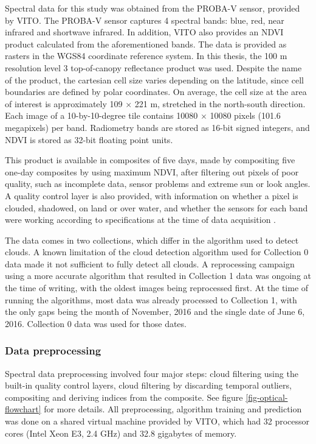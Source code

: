 \documentclass[a4paper,10pt]{book}
\begin{document}
Spectral data for this study was obtained from the PROBA-V sensor, provided by VITO. The PROBA-V sensor captures 4 spectral bands: blue, red, near infrared and shortwave infrared. In addition, VITO also provides an NDVI product calculated from the aforementioned bands. The data is provided as rasters in the WGS84 coordinate reference system. In this thesis, the 100 m resolution level 3 top-of-canopy reflectance product was used. Despite the name of the product, the cartesian cell size varies depending on the latitude, since cell boundaries are defined by polar coordinates. On average, the cell size at the area of interest is approximately 109 $\times{}$ 221 m, stretched in the north-south direction. Each image of a 10-by-10-degree tile contains 10080 $\times{}$ 10080 pixels (101.6 megapixels) per band. Radiometry bands are stored as 16-bit signed integers, and NDVI is stored as 32-bit floating point units.

This product is available in composites of five days, made by compositing five one-day composites by using maximum NDVI, after filtering out pixels of poor quality, such as incomplete data, sensor problems and extreme sun or look angles. A quality control layer is also provided, with information on whether a pixel is clouded, shadowed, on land or over water, and whether the sensors for each band were working according to specifications at the time of data acquisition \citep{probavguide2}.

The data comes in two collections, which differ in the algorithm used to detect clouds. A known limitation of the cloud detection algorithm used for Collection 0 data made it not sufficient to fully detect all clouds. A reprocessing campaign using a more accurate algorithm that resulted in Collection 1 data \citep{probavguide2} was ongoing at the time of writing, with the oldest images being reprocessed first. At the time of running the algorithms, most data was already processed to Collection 1, with the only gaps being the month of November, 2016 and the single date of June 6, 2016. Collection 0 data was used for those dates.

\subsubsection{Data preprocessing}
\label{sec-spectral-preprocessing}

Spectral data preprocessing involved four major steps: cloud filtering using the built-in quality control layers, cloud filtering by discarding temporal outliers, compositing and deriving indices from the composite. See figure \ref{fig-optical-flowchart} for more details. All preprocessing, algorithm training and prediction was done on a shared virtual machine provided by VITO, which had 32 processor cores (Intel Xeon E3, 2.4 GHz) and 32.8 gigabytes of memory.
\end{document}
